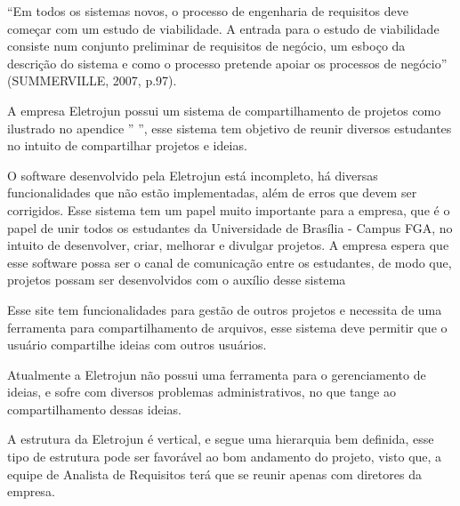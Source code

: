 “Em todos os sistemas novos, o processo de engenharia de requisitos deve começar com um estudo de viabilidade. A entrada para o estudo de viabilidade consiste num conjunto preliminar de requisitos de negócio, um esboço da descrição do sistema e como o processo pretende apoiar os processos de negócio” (SUMMERVILLE, 2007, p.97).
	
A empresa Eletrojun possui um sistema de compartilhamento de projetos como ilustrado no apendice '' ”, esse sistema tem objetivo de reunir diversos estudantes no intuito de compartilhar projetos e ideias.

O software desenvolvido pela Eletrojun está incompleto, há diversas funcionalidades que não estão implementadas, além de erros que devem ser corrigidos. Esse sistema tem um papel muito importante para a empresa, que é o papel de unir todos os estudantes da Universidade de Brasília - Campus FGA, no intuito de desenvolver, criar, melhorar e divulgar projetos. A empresa espera que esse software possa ser o canal de comunicação entre os estudantes, de modo que, projetos possam ser desenvolvidos com o auxílio desse sistema

Esse site tem funcionalidades para gestão de outros projetos e necessita de uma ferramenta para compartilhamento de arquivos, esse sistema deve permitir que o usuário compartilhe ideias com outros usuários.

Atualmente a Eletrojun não possui uma ferramenta para o gerenciamento de ideias, e sofre com diversos problemas administrativos, no que tange ao
compartilhamento dessas ideias.

A estrutura da Eletrojun é vertical, e segue uma hierarquia bem definida, esse tipo de estrutura pode ser favorável ao bom andamento do projeto, visto que, a equipe de Analista de Requisitos terá que se reunir apenas com diretores da empresa.

